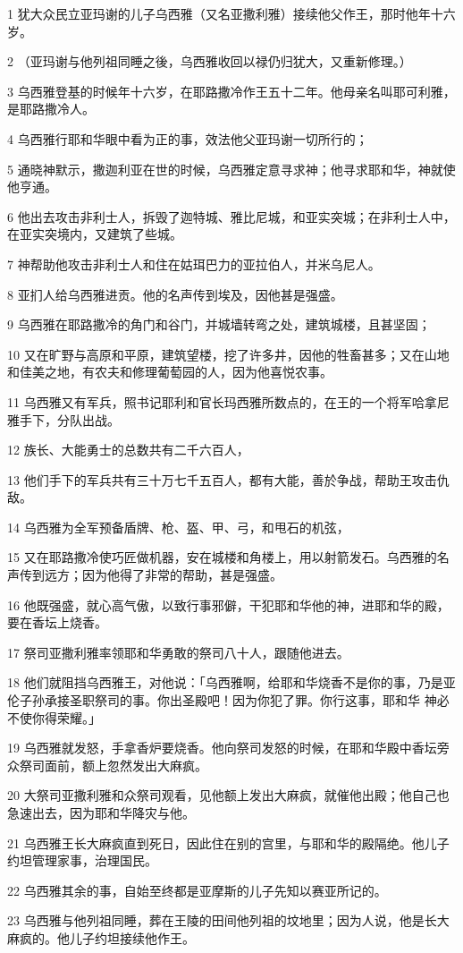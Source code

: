 \par 1 犹大众民立亚玛谢的儿子乌西雅（又名亚撒利雅）接续他父作王，那时他年十六岁。
\par 2 （亚玛谢与他列祖同睡之後，乌西雅收回以禄仍归犹大，又重新修理。）
\par 3 乌西雅登基的时候年十六岁，在耶路撒冷作王五十二年。他母亲名叫耶可利雅，是耶路撒冷人。
\par 4 乌西雅行耶和华眼中看为正的事，效法他父亚玛谢一切所行的；
\par 5 通晓神默示，撒迦利亚在世的时候，乌西雅定意寻求神；他寻求耶和华，神就使他亨通。
\par 6 他出去攻击非利士人，拆毁了迦特城、雅比尼城，和亚实突城；在非利士人中，在亚实突境内，又建筑了些城。
\par 7 神帮助他攻击非利士人和住在姑珥巴力的亚拉伯人，并米乌尼人。
\par 8 亚扪人给乌西雅进贡。他的名声传到埃及，因他甚是强盛。
\par 9 乌西雅在耶路撒冷的角门和谷门，并城墙转弯之处，建筑城楼，且甚坚固；
\par 10 又在旷野与高原和平原，建筑望楼，挖了许多井，因他的牲畜甚多；又在山地和佳美之地，有农夫和修理葡萄园的人，因为他喜悦农事。
\par 11 乌西雅又有军兵，照书记耶利和官长玛西雅所数点的，在王的一个将军哈拿尼雅手下，分队出战。
\par 12 族长、大能勇士的总数共有二千六百人，
\par 13 他们手下的军兵共有三十万七千五百人，都有大能，善於争战，帮助王攻击仇敌。
\par 14 乌西雅为全军预备盾牌、枪、盔、甲、弓，和甩石的机弦，
\par 15 又在耶路撒冷使巧匠做机器，安在城楼和角楼上，用以射箭发石。乌西雅的名声传到远方；因为他得了非常的帮助，甚是强盛。
\par 16 他既强盛，就心高气傲，以致行事邪僻，干犯耶和华他的神，进耶和华的殿，要在香坛上烧香。
\par 17 祭司亚撒利雅率领耶和华勇敢的祭司八十人，跟随他进去。
\par 18 他们就阻挡乌西雅王，对他说：「乌西雅啊，给耶和华烧香不是你的事，乃是亚伦子孙承接圣职祭司的事。你出圣殿吧！因为你犯了罪。你行这事，耶和华 神必不使你得荣耀。」
\par 19 乌西雅就发怒，手拿香炉要烧香。他向祭司发怒的时候，在耶和华殿中香坛旁众祭司面前，额上忽然发出大麻疯。
\par 20 大祭司亚撒利雅和众祭司观看，见他额上发出大麻疯，就催他出殿；他自己也急速出去，因为耶和华降灾与他。
\par 21 乌西雅王长大麻疯直到死日，因此住在别的宫里，与耶和华的殿隔绝。他儿子约坦管理家事，治理国民。
\par 22 乌西雅其余的事，自始至终都是亚摩斯的儿子先知以赛亚所记的。
\par 23 乌西雅与他列祖同睡，葬在王陵的田间他列祖的坟地里；因为人说，他是长大麻疯的。他儿子约坦接续他作王。

